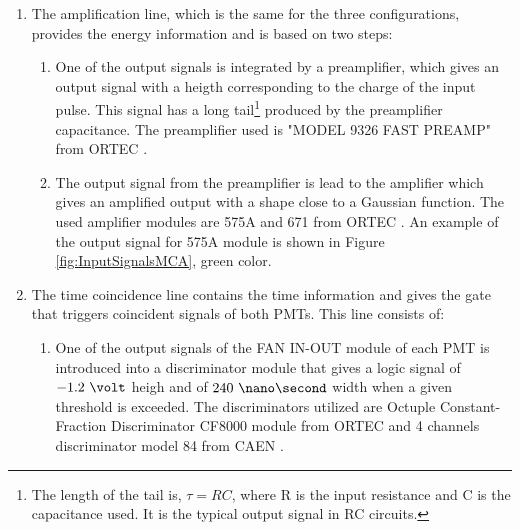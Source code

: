 \begin{enumerate}

\item{} The amplification line, which is the same for the three configurations, provides the energy information and is based on two steps:



\begin{enumerate}

\item{} One of the output signals is integrated by a preamplifier, which gives an output signal with a heigth corresponding to the charge of the input pulse. This signal has a long tail\footnote{The length of the tail is, $\tau=RC$, where R is the input resistance and C is the capacitance used. It is the typical output signal in RC circuits.} produced by the preamplifier capacitance. The preamplifier used is "MODEL 9326 FAST PREAMP" from ORTEC \cite{DataSheetPreAmp}.

\item{} The output signal from the preamplifier is lead to the amplifier which gives an amplified output with a shape close to a Gaussian function. The used  amplifier modules are 575A and 671 from ORTEC \cite{DataSheet575Amp, DataSheet671Amp}. An example of the output signal for 575A module is shown in Figure \ref{fig:InputSignalsMCA}, green color.

\end{enumerate}

\item{} The time coincidence line contains the time information and gives the gate that triggers coincident signals of both PMTs. This line consists of:

\begin{enumerate}

\item{} One of the output signals of the FAN IN-OUT module of each PMT is introduced into a discriminator module that gives a logic signal of $-1.2~\volt$ heigh and of $240~\nano\second$ width when a given threshold is exceeded. The discriminators utilized are  Octuple Constant-Fraction Discriminator CF8000 module from ORTEC \cite{DataSheetDiscriminator} and 4 channels discriminator model 84 from CAEN \cite{DataSheetDiscriminatorCAEN}.


\end{enumerate}
\end{enumerate}
